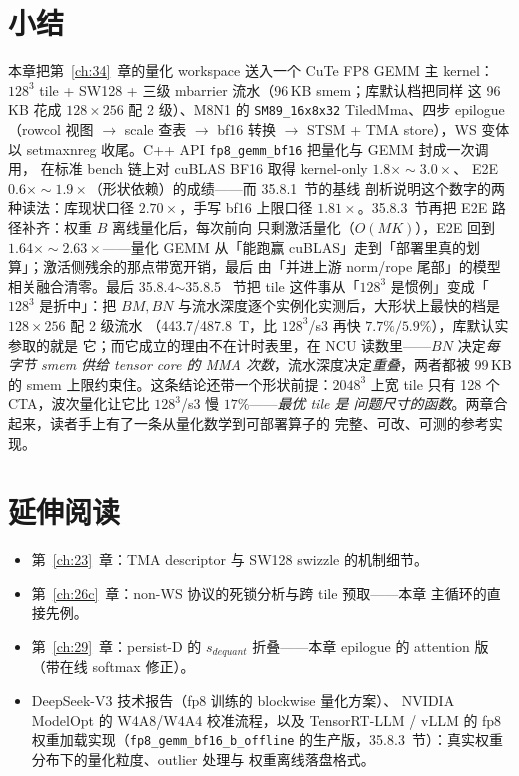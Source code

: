 \section{小结}

本章把第~\ref{ch:34}~章的量化 workspace 送入一个 CuTe FP8 GEMM 主 kernel：
$128^3$ tile + SW128 + 三级 mbarrier 流水（96\,KB smem；库默认档把同样
这 96\,KB 花成 $128\times256$ 配 2 级）、M8N1 的
\texttt{SM89\_16x8x32} TiledMma、四步 epilogue（rowcol 视图 $\to$ scale
查表 $\to$ bf16 转换 $\to$ STSM + TMA store），WS 变体以 setmaxnreg
收尾。C++ API \texttt{fp8\_gemm\_bf16} 把量化与 GEMM 封成一次调用，
在标准 bench 链上对 cuBLAS BF16 取得 kernel-only $1.8\times\sim3.0\times$、
E2E $0.6\times\sim1.9\times$（形状依赖）的成绩——而 35.8.1~节的基线
剖析说明这个数字的两种读法：库现状口径 $2.70\times$，手写 bf16 上限口径
$1.81\times$。35.8.3~节再把 E2E 路径补齐：权重 $B$ 离线量化后，每次前向
只剩激活量化（$O(MK)$），E2E 回到 $1.64\times\sim2.63\times$——量化 GEMM
从「能跑赢 cuBLAS」走到「部署里真的划算」；激活侧残余的那点带宽开销，最后
由「并进上游 norm/rope 尾部」的模型相关融合清零。最后 35.8.4$\sim$35.8.5
~节把 tile 这件事从「$128^3$ 是惯例」变成「$128^3$ 是折中」：把 $BM,BN$
与流水深度逐个实例化实测后，大形状上最快的档是 $128\times256$ 配 2 级流水
（443.7/487.8~T，比 $128^3$/s3 再快 $7.7\%/5.9\%$），库默认实参取的就是
它；而它成立的理由不在计时表里，在 NCU 读数里——$BN$ 决定\emph{每字节
smem 供给 tensor core 的 MMA 次数}，流水深度决定\emph{重叠}，两者都被
99\,KB 的 smem 上限约束住。这条结论还带一个形状前提：$2048^3$ 上宽 tile
只有 128 个 CTA，波次量化让它比 $128^3$/s3 慢 $17\%$——\emph{最优 tile 是
问题尺寸的函数}。两章合起来，读者手上有了一条从量化数学到可部署算子的
完整、可改、可测的参考实现。

\section*{延伸阅读}

\begin{itemize}[itemsep=1pt,topsep=2pt]
  \item 第~\ref{ch:23}~章：TMA descriptor 与 SW128 swizzle 的机制细节。
  \item 第~\ref{ch:26c}~章：non-WS 协议的死锁分析与跨 tile 预取——本章
        主循环的直接先例。
  \item 第~\ref{ch:29}~章：persist-D 的 $s_{dequant}$ 折叠——本章 epilogue
        的 attention 版（带在线 softmax 修正）。
\item DeepSeek-V3 技术报告（fp8 训练的 blockwise 量化方案）、
        NVIDIA ModelOpt 的 W4A8/W4A4 校准流程，以及 TensorRT-LLM /
        vLLM 的 fp8 权重加载实现（\texttt{fp8\_gemm\_bf16\_b\_offline}
        的生产版，35.8.3~节）：真实权重分布下的量化粒度、outlier 处理与
        权重离线落盘格式。
\end{itemize}
